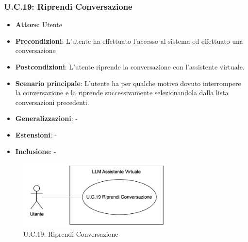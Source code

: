 \subsubsection{U.C.19: Riprendi Conversazione}
\begin{itemize}
    \item \textbf{Attore}: Utente
    \item \textbf{Precondizioni}: L’utente ha effettuato l’accesso al sistema ed effettuato una conversazione
    \item \textbf{Postcondizioni}: L’utente riprende la conversazione con l’assistente virtuale.
    \item \textbf{Scenario principale}: L’utente ha per qualche motivo dovuto interrompere la conversazione e la riprende successivamente selezionandola dalla lista conversazioni precedenti.
    \item \textbf{Generalizzazioni}: -
    \item \textbf{Estensioni}: -
    \item \textbf{Inclusione}: -
\end{itemize}
\begin{figure}[H]
    \centering
    \includegraphics[width=0.7\textwidth]{img/UC19.png}
    \caption{U.C.19: Riprendi Conversazione}
\end{figure}
\newpage

